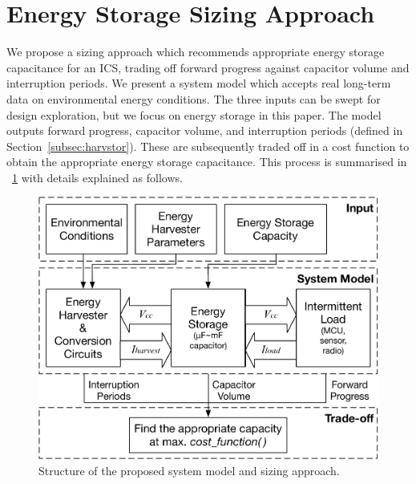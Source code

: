 
\section{Energy Storage Sizing Approach} \label{section:approach}

We propose a sizing approach which recommends appropriate energy storage capacitance for an ICS, trading off forward progress against capacitor volume and interruption periods. We present a system model which accepts real long-term data on environmental energy conditions. The three inputs can be swept for design exploration, but we focus on energy storage in this paper. The model outputs forward progress, capacitor volume, and interruption periods (defined in Section~\ref{subsec:harvstor}). These are subsequently traded off in a cost function to obtain the appropriate energy storage capacitance. This process is summarised in \figurename{~\ref{fig:sizingapproach}} with details explained as follows. 

\begin{figure}[!t]
    \centering
    \includegraphics[width=0.8\columnwidth]{ch4_sizingapproach/figures/mdlfrw4}
    \caption{Structure of the proposed system model and sizing approach.}
    \label{fig:sizingapproach}
\end{figure}
    
